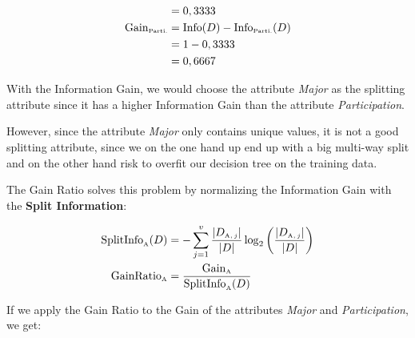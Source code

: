 \documentclass[
english,
smallborders
]{i6prcsht}
\newcommand{\OfAttribute}[1]{_{\text{\tiny #1}}}
\begin{document}
\begin{solution}
\begin{alignat*}{3}
		                                   & =  0,3333                                                                                                                                                                                                                                         \\
		\text{Gain}\OfAttribute{Parti.}    & = \text{Info}(D) - \text{Info}\OfAttribute{Parti.}(D)                                                                                                                                                                                             \\
		                                   & = 1 - 0,3333                                                                                                                                                                                                                                      \\
		                                   & = 0,6667                                                                                                                                                                                                                                          \\
	\end{alignat*}

	With the Information Gain, we would choose the attribute \textit{Major} as the splitting attribute since it has a higher Information Gain than the attribute \textit{Participation}.

	However, since the attribute \textit{Major} only contains unique values, it is not a good splitting attribute, since we on the one hand up end up with a big multi-way split and on the other hand risk to overfit our decision tree on the training data.

	The Gain Ratio solves this problem by normalizing the Information Gain with the \textbf{Split Information}:

	\begin{alignat*}{2}
		\text{SplitInfo}\OfAttribute{A}(D) & = -\sum_{j=1}^{v} \frac{|D\OfAttribute{A$,j$}|}{|D|} \log_2\left(\frac{|D\OfAttribute{A$,j$}|}{|D|}\right) \\
		\text{GainRatio}\OfAttribute{A}    & = \frac{\text{Gain}\OfAttribute{A}}{\text{SplitInfo}\OfAttribute{A}(D)}
	\end{alignat*}

	If we apply the Gain Ratio to the Gain of the attributes \textit{Major} and \textit{Participation}, we get:


\end{solution}
\end{document}
